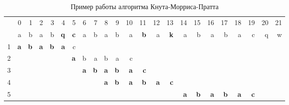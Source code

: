 \documentclass[a4paper,12pt]{article}
\begin{document}
\begin{table} [h!]
\begin{center}
\caption{Пример работы алгоритма Кнута-Морриса-Пратта}
\begin{tabular}{|rrrrrrrrrrrrrrrrrrrrrrr|}
\hline
           &          0 &          1 &          2 &          3 &          4 &          5 &          6 &          7 &          8 &          9 &         10 &         11 &         12 &         13 &         14 &         15 &         16 &         17 &         18 &         19 &         20 &         21 \\

           &          a &          b &          a &          b &    {\bf q} &    {\bf c} &          a &          b &          a &          b &          a &    {\bf b} &          a &    {\bf k} &          a &          b &          a &          b &          a &          c &          q &          w \\

         1 &    {\bf a} &    {\bf b} &    {\bf a} &    {\bf b} &    {\bf a} &          c &            &            &            &            &            &            &            &            &            &            &            &            &            &            &            &            \\

         2 &            &            &            &            &            &    {\bf a} &          b &          a &          b &          a &          c &            &            &            &            &            &            &            &            &            &            &            \\

         3 &            &            &            &            &            &            &    {\bf a} &    {\bf b} &    {\bf a} &    {\bf b} &    {\bf a} &    {\bf c} &            &            &            &            &            &            &            &            &            &            \\

         4 &            &            &            &            &            &            &            &            &    {\bf a} &    {\bf b} &    {\bf a} &    {\bf b} &    {\bf a} &    {\bf c} &            &            &            &            &            &            &            &            \\

         5 &            &            &            &            &            &            &            &            &            &            &            &            &            &            &    {\bf a} &    {\bf b} &    {\bf a} &    {\bf b} &    {\bf a} &    {\bf c} &            &            \\
\hline
\end{tabular}  
\label{kmp_cmp}
\end{center}
\end{table}
\end{document}
